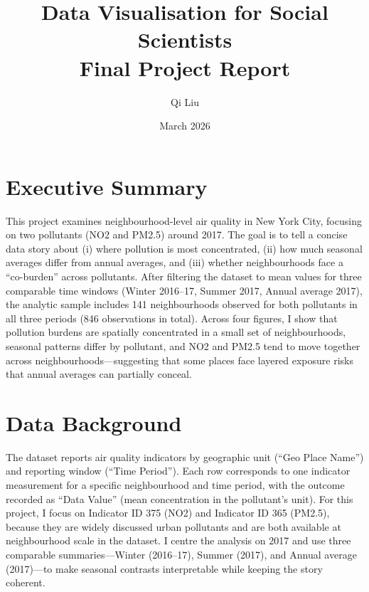 \documentclass[11pt,a4paper]{article}
\title{\textbf{Data Visualisation for Social Scientists\\Final Project Report}}
\author{Qi Liu}
\date{March 2026}
\begin{document}
	
	\maketitle
	\thispagestyle{empty}
	
	\tableofcontents
	\newpage
	
	\vspace{1em}
	
\section*{Executive Summary}
	
	This project examines neighbourhood-level air quality in New York City, focusing on two pollutants (NO2 and PM2.5) around 2017. The goal is to tell a concise data story about (i) where pollution is most concentrated, (ii) how much seasonal averages differ from annual averages, and (iii) whether neighbourhoods face a ``co-burden'' across pollutants. After filtering the dataset to mean values for three comparable time windows (Winter 2016--17, Summer 2017, Annual average 2017), the analytic sample includes 141 neighbourhoods observed for both pollutants in all three periods (846 observations in total). Across four figures, I show that pollution burdens are spatially concentrated in a small set of neighbourhoods, seasonal patterns differ by pollutant, and NO2 and PM2.5 tend to move together across neighbourhoods---suggesting that some places face layered exposure risks that annual averages can partially conceal.
	
	\section*{Data Background}
	
	The dataset reports air quality indicators by geographic unit (``Geo Place Name'') and reporting window (``Time Period''). Each row corresponds to one indicator measurement for a specific neighbourhood and time period, with the outcome recorded as ``Data Value'' (mean concentration in the pollutant's unit). For this project, I focus on Indicator ID 375 (NO2) and Indicator ID 365 (PM2.5), because they are widely discussed urban pollutants and are both available at neighbourhood scale in the dataset. I centre the analysis on 2017 and use three comparable summaries---Winter (2016--17), Summer (2017), and Annual average (2017)---to make seasonal contrasts interpretable while keeping the story coherent.
	
\end{document}
